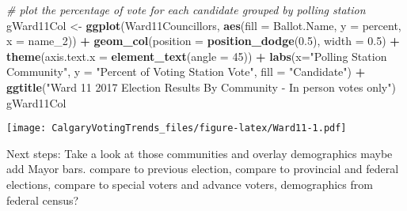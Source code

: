 \documentclass[
]{article}
\newenvironment{Shaded}{\begin{snugshade}}{\end{snugshade}}
\newcommand{\CommentTok}[1]{\textcolor[rgb]{0.56,0.35,0.01}{\textit{#1}}}
\newcommand{\DataTypeTok}[1]{\textcolor[rgb]{0.13,0.29,0.53}{#1}}
\newcommand{\DecValTok}[1]{\textcolor[rgb]{0.00,0.00,0.81}{#1}}
\newcommand{\FloatTok}[1]{\textcolor[rgb]{0.00,0.00,0.81}{#1}}
\newcommand{\KeywordTok}[1]{\textcolor[rgb]{0.13,0.29,0.53}{\textbf{#1}}}
\newcommand{\NormalTok}[1]{#1}
\newcommand{\OperatorTok}[1]{\textcolor[rgb]{0.81,0.36,0.00}{\textbf{#1}}}
\newcommand{\StringTok}[1]{\textcolor[rgb]{0.31,0.60,0.02}{#1}}
\begin{document}
\begin{Shaded}
\begin{Highlighting}[]
\CommentTok{# plot the percentage of vote for each candidate grouped by polling station}
\NormalTok{gWard11Col <-}\StringTok{ }\KeywordTok{ggplot}\NormalTok{(Ward11Councillors, }\KeywordTok{aes}\NormalTok{(}\DataTypeTok{fill =}\NormalTok{ Ballot.Name, }\DataTypeTok{y =}\NormalTok{ percent, }\DataTypeTok{x =}\NormalTok{ name_}\DecValTok{2}\NormalTok{)) }\OperatorTok{+}
\StringTok{  }\KeywordTok{geom_col}\NormalTok{(}\DataTypeTok{position =} \KeywordTok{position_dodge}\NormalTok{(}\FloatTok{0.5}\NormalTok{), }\DataTypeTok{width =} \FloatTok{0.5}\NormalTok{) }\OperatorTok{+}
\StringTok{  }\KeywordTok{theme}\NormalTok{(}\DataTypeTok{axis.text.x =} \KeywordTok{element_text}\NormalTok{(}\DataTypeTok{angle =} \DecValTok{45}\NormalTok{)) }\OperatorTok{+}
\StringTok{  }\KeywordTok{labs}\NormalTok{(}\DataTypeTok{x=}\StringTok{"Polling Station Community"}\NormalTok{, }\DataTypeTok{y =} \StringTok{"Percent of Voting Station Vote"}\NormalTok{, }\DataTypeTok{fill =} \StringTok{"Candidate"}\NormalTok{) }\OperatorTok{+}
\StringTok{  }\KeywordTok{ggtitle}\NormalTok{(}\StringTok{"Ward 11 2017 Election Results By Community - In person votes only"}\NormalTok{)}
\NormalTok{gWard11Col}
\end{Highlighting}
\end{Shaded}

\texttt{[image: CalgaryVotingTrends\_files/figure-latex/Ward11-1.pdf]}

Next steps: Take a look at those communities and overlay demographics
maybe add Mayor bars. compare to previous election, compare to
provincial and federal elections, compare to special voters and advance
voters, demographics from federal census?
\end{document}
